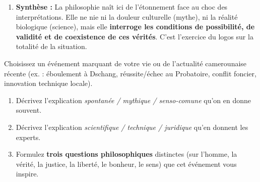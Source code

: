 \documentclass[11pt]{article}
\newcommand{\cle}[1]{{\popxbold\color{popdark}#1}}
\begin{document}
\begin{exoresolu}
\begin{enumerate}
        \begin{itemize}
            \item \emph{Sur le savoir :} Pourquoi deux explications incompatibles coexistent-elles ? (Épistémologie : pluralisme des régimes de vérité).
            \item \emph{Sur l'homme :} La mort réduit-elle l'homme à un corps biologique ? Qu'en est-il de sa \emph{dignité}, de son \emph{nom}, de sa \emph{fonction symbolique} ? (Anthropologie philosophique).
            \item \emph{Sur la justice :} Accuser le clan rival sans preuve est-il juste ? La « vérité » judiciaire (procès de sorcellerie) vaut-elle la vérité scientifique ? (Philosophie du droit / Éthique).
            \item \emph{Sur le sens :} La mort du chef a-t-elle un \emph{sens} pour la communauté au-delà de sa cause biologique ? (Métaphysique / Philosophie de la culture).
        \end{itemize}
    \item \textbf{Synthèse :} La philosophie naît ici de l'\cle{étonnement} face au choc des interprétations. Elle ne nie ni la douleur culturelle (mythe), ni la réalité biologique (science), mais elle \textbf{interroge les conditions de possibilité, de validité et de coexistence de ces vérités}. C'est l'exercice du \cle{logos} sur la \cle{totalité} de la situation.
\end{enumerate}
\end{exoresolu}

\begin{exercice}
Choisissez un événement marquant de votre vie ou de l'actualité camerounaise récente (ex. : éboulement à Dschang, réussite/échec au Probatoire, conflit foncier, innovation technique locale).
\begin{enumerate}
    \item Décrivez l'explication \emph{spontanée / mythique / senso-comune} qu'on en donne souvent.
    \item Décrivez l'explication \emph{scientifique / technique / juridique} qu'en donnent les experts.
    \item Formulez \textbf{trois questions philosophiques} distinctes (sur l'homme, la vérité, la justice, la liberté, le bonheur, le sens) que cet événement vous inspire.
\end{enumerate}
\end{exercice}
\end{document}
